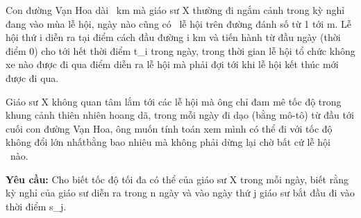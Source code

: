 Con đường Vạn Hoa dài                                                    km mà giáo sư X thường đi ngắm cảnh trong kỳ nghỉ đang vào mùa lễ hội, ngày nào cũng có     lễ hội trên đường đánh số từ 1 tới m. Lễ hội thứ i diễn ra tại điểm cách đầu đường i km và tiến hành từ đầu ngày (thời điểm 0) cho tới hết thời điểm t\_i trong ngày, trong thời gian lễ hội tổ chức không xe nào được đi qua điểm diễn ra lễ hội mà phải đợi tới khi lễ hội kết thúc mới được đi qua.  

   Giáo sư X không quan tâm lắm tới các lễ hội mà ông chỉ đam mê tốc độ trong khung cảnh thiên nhiên hoang dã, trong mỗi ngày đi dạo (bằng mô-tô) từ đầu tới cuối con đường Vạn Hoa, ông muốn tính toán xem mình có thể đi với tốc độ không đổi lớn nhấtbằng bao nhiêu mà không phải dừng lại chờ bất cứ lễ hội  nào.  

\textbf{    Yêu cầu:   }   Cho biết tốc độ tối đa có thể của giáo sư X trong mỗi ngày, biết rằng kỳ nghỉ của giáo sư diễn ra trong n ngày và vào ngày thứ j giáo sư bắt đầu đi vào thời điểm s\_j.